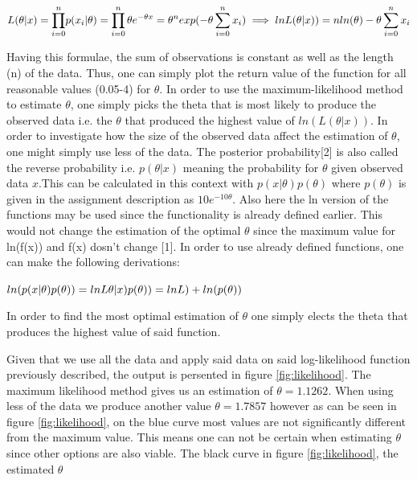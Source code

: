 \documentclass[a4paper, twocolumn]{article}
\begin{document}
	{\large \(L(\theta | x) = {\displaystyle \prod_{i = 0}^{n}}p(x_i|\theta) \newline = \displaystyle \prod_{i = 0}^{n}\theta e^{-\theta x}=\theta^n exp(-\theta \sum_{i=0}^{n}x_i) \newline \implies ln L(\theta | x)) = n ln(\theta) - \theta \sum_{i=0}^n x_i \)}
	\newline
	
	Having this formulae, the sum of observations is constant as well as the length (n) of the data. Thus, one can simply plot the return value of the function for all reasonable values (0.05-4) for \(\theta\). In order to use the maximum-likelihood method to estimate \(\theta\), one simply picks the theta that is most likely to produce the observed data i.e. the \(\theta\) that produced the highest value of \(ln( L(\theta | x))\). In order to investigate how the size of the observed data affect the estimation of \(\theta\), one might simply use less of the data. \newline\newline
	The posterior probability[2] is also called the reverse probability i.e. \(p(\theta|x)\) meaning the probability for \(\theta\) given observed data \(x\).This can be calculated in this context with \(p(x|\theta)p(\theta)\) where \(p(\theta)\) is given in the assignment description as \(10 e^{-10\theta }\). Also here the ln version of the functions may be used since the functionality is already defined earlier. This would not change the estimation of the optimal \(\theta\) since the maximum value for ln(f(x)) and f(x) dosn't change [1]. In order to use already defined functions, one can make the following derivations:\newline
	
	{\large \(ln(p(x|\theta)p(\theta)) = ln L\theta|x)p(\theta)) \newline = ln L) + ln(p(\theta))\)} \newline
	
	In order to find the most optimal estimation of \(\theta\) one simply elects the theta that produces the highest value of said function.
	
	Given that we use all the data and apply said data on said log-likelihood function previously described, the output is persented in figure \ref{fig:likelihood}. The maximum likelihood method gives us an estimation of \(\theta = 1.1262\). When using less of the data we produce another value \(\theta = 1.7857\) however as can be seen in figure \ref{fig:likelihood}, on the blue curve most values are not significantly different from the maximum value. This means one can not be certain when estimating \(\theta\) since other options are also viable. The black curve in figure \ref{fig:likelihood}, the estimated \(\theta \)
	
\end{document}
